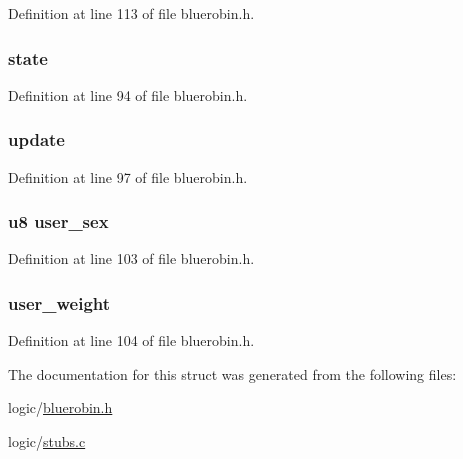 \-Definition at line 113 of file bluerobin.\-h.

\hypertarget{structbr_a0929ffe8f07d1756ee75c71fb89d12bc}{
\subsubsection[{state}]{ {\bf state}}}\label{structbr_a0929ffe8f07d1756ee75c71fb89d12bc}


\-Definition at line 94 of file bluerobin.\-h.

\hypertarget{structbr_a8cc6727deeda7edbd8a611f7436081ea}{
\subsubsection[{update}]{ {\bf update}}}\label{structbr_a8cc6727deeda7edbd8a611f7436081ea}


\-Definition at line 97 of file bluerobin.\-h.

\hypertarget{structbr_a753dfdbb988f7a6c3cba1da48987c9ba}{
\subsubsection[{user\-\_\-sex}]{\setlength{\rightskip}{0pt plus 5cm}u8 {\bf user\-\_\-sex}}}\label{structbr_a753dfdbb988f7a6c3cba1da48987c9ba}


\-Definition at line 103 of file bluerobin.\-h.

\hypertarget{structbr_afbd1f6401c61aa55759c487e35ad9ff2}{
\subsubsection[{user\-\_\-weight}]{ {\bf user\-\_\-weight}}}\label{structbr_afbd1f6401c61aa55759c487e35ad9ff2}


\-Definition at line 104 of file bluerobin.\-h.



\-The documentation for this struct was generated from the following files\-:\begin{DoxyCompactItemize}
\item 
logic/\hyperlink{bluerobin_8h}{bluerobin.\-h}\item 
logic/\hyperlink{stubs_8c}{stubs.\-c}\end{DoxyCompactItemize}
